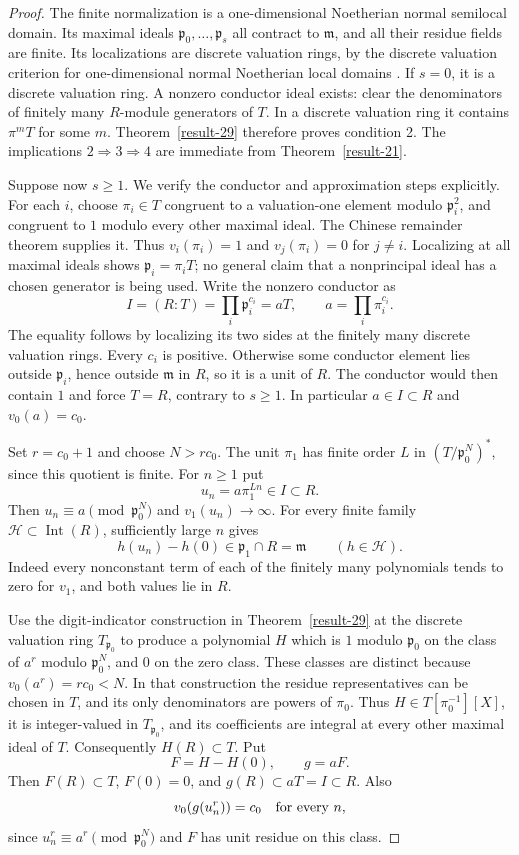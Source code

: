 \documentclass[11pt,a4paper]{article}
\theoremstyle{definition}
\begin{document}
\begin{proof}
The finite normalization is a one-dimensional Noetherian normal
semilocal domain. Its maximal ideals
$\mathfrak p_0,\ldots,\mathfrak p_s$ all contract to
$\mathfrak m$, and all their residue fields are finite.
Its localizations are discrete valuation rings, by the discrete valuation criterion for one-dimensional normal
Noetherian local domains \cite[Lemma 10.119.7, tag 00PD]{StacksNormalDomains}. If $s=0$, it is a discrete
valuation ring. A nonzero conductor ideal exists: clear the
denominators of finitely many $R$-module generators of $T$.
In a discrete valuation ring it contains $\pi^mT$ for some $m$.
Theorem~\ref{result-29} therefore proves condition 2. The implications
$2\Rightarrow3\Rightarrow4$ are immediate from Theorem~\ref{result-21}.

Suppose now $s\ge1$. We verify the conductor and approximation
steps explicitly. For each $i$, choose $\pi_i\in T$ congruent
to a valuation-one element modulo $\mathfrak p_i^2$, and
congruent to $1$ modulo every other maximal ideal. The Chinese
remainder theorem supplies it. Thus
$v_i(\pi_i)=1$ and $v_j(\pi_i)=0$ for $j\ne i$.
Localizing at all maximal ideals shows
$\mathfrak p_i=\pi_iT$; no general claim that a nonprincipal
ideal has a chosen generator is being used.
Write the nonzero conductor as
\[
 I=(R:T)=\prod_i\mathfrak p_i^{c_i}=aT,
 \qquad a=\prod_i\pi_i^{c_i}.
\]
The equality follows by localizing its two sides at the finitely
many discrete valuation rings. Every $c_i$ is positive. Otherwise
some conductor element lies outside $\mathfrak p_i$, hence outside
$\mathfrak m$ in $R$, so it is a unit of $R$. The conductor would
then contain $1$ and force $T=R$, contrary to $s\ge1$.
In particular $a\in I\subset R$ and $v_0(a)=c_0$.

Set $r=c_0+1$ and choose $N>r c_0$.
The unit $\pi_1$ has finite order $L$ in
$(T/\mathfrak p_0^N)^*$, since this quotient is finite.
For $n\ge1$ put
\[
 u_n=a\pi_1^{Ln}\in I\subset R.
\]
Then $u_n\equiv a\pmod{\mathfrak p_0^N}$ and
$v_1(u_n)\longrightarrow\infty$. For every finite family
$\mathcal H\subset\operatorname{Int}(R)$, sufficiently large $n$
gives
\[
 h(u_n)-h(0)\in\mathfrak p_1\cap R=\mathfrak m
 \qquad(h\in\mathcal H).
\]
Indeed every nonconstant term of each of the finitely many
polynomials tends to zero for $v_1$, and both
values lie in $R$.

Use the digit-indicator construction in Theorem~\ref{result-29} at the discrete
valuation ring $T_{\mathfrak p_0}$ to produce a polynomial $H$
which is $1$ modulo $\mathfrak p_0$ on the class of $a^r$ modulo
$\mathfrak p_0^N$, and $0$ on the zero class. These classes are
distinct because $v_0(a^r)=r c_0<N$. In that construction the
residue representatives can be chosen in $T$, and its only
denominators are powers of $\pi_0$. Thus
$H\in T[\pi_0^{-1}][X]$, it is integer-valued in
$T_{\mathfrak p_0}$, and its coefficients are integral at every
other maximal ideal of $T$. Consequently $H(R)\subset T$.
Put
\[
 F=H-H(0),\qquad g=aF.
\]
Then $F(R)\subset T$, $F(0)=0$, and
$g(R)\subset aT=I\subset R$. Also
\[
 v_0(g(u_n^r))=c_0\quad\hbox{for every }n,
\]
since $u_n^r\equiv a^r\pmod{\mathfrak p_0^N}$ and $F$ has
unit residue on this class.


\end{proof}
\end{document}
